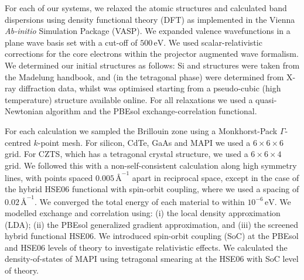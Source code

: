 For each of our systems, we relaxed the atomic structures and calculated band dispersions using density functional theory (DFT) as implemented in the Vienna \textit{Ab-initio} Simulation Package (\textsc{VASP}).\autocite{Kresse1996} We expanded valence wavefunctions in a plane wave basis set with a cut-off of $500\,\mathrm{eV}$. We used scalar-relativistic corrections for the core electrons within the projector augmented wave formalism.\autocite{Blochl1994}
We determined our initial structures as follows: Si and  structures were taken from the Madelung handbook,\autocite{Madelung2004}  \autocite{Rabadanov2001} and \autocite{Lafond2014} (in the tetragonal phase) were determined from X-ray diffraction data, whilst  was optimised starting from a pseudo-cubic (high temperature) structure available online.\autocite{WMD} For all relaxations we used a quasi-Newtonian algorithm and the PBEsol exchange-correlation functional.

For each calculation we sampled the Brillouin zone using a Monkhorst-Pack $\Gamma$-centred $k$-point mesh. For silicon, CdTe, GaAs and MAPI we used a $6\!\times\!6\!\times\!6$ grid. For CZTS, which has a tetragonal crystal structure, we used a $6\!\times\!6\!\times\!4$ grid. We followed this with a non-self-consistent calculation along high symmetry lines\autocite{Setyawan2010}, with points spaced $0.005\,\text{\AA}^{-1}$ apart in reciprocal space, except in the case of the hybrid HSE06 functional with spin-orbit coupling, where we used a spacing of $0.02\,\text{\AA}^{-1}$. We converged the total energy of each material to within $10^{-6}\,\mathrm{eV}$. We modelled exchange and correlation using: (i) the local density approximation (LDA); (ii) the PBEsol\autocite{Perdew2008} generalized gradient approximation, and (iii) the screened hybrid functional HSE06.\autocite{Heyd2003} We introduced spin-orbit coupling (SoC) at the PBEsol and HSE06 levels of theory to investigate relativistic effects. 
We calculated the density-of-states of MAPI using tetragonal smearing at the HSE06 with SoC level of theory. 

